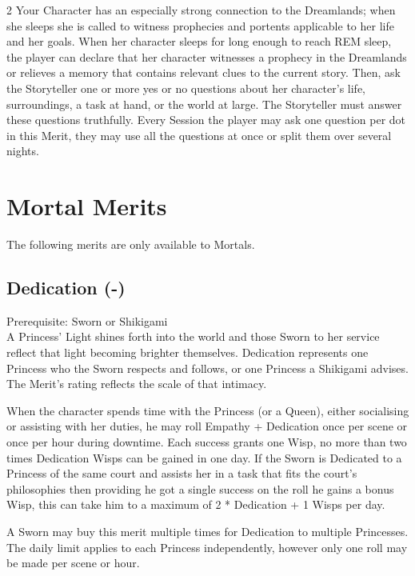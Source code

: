 \begin{multicols}{2}
\noindent Your Character has an especially strong connection to the Dreamlands; when she sleeps she is called to witness prophecies and portents applicable to her life and her goals. When her character sleeps for long enough to reach REM sleep, the player can declare that her character witnesses a prophecy in the Dreamlands or relieves a memory that contains relevant clues to the current story. Then, ask the Storyteller one or more yes or no questions about her character’s life, surroundings, a task at hand, or the world at large. The Storyteller must answer these questions truthfully. Every Session the player may ask one question per dot in this Merit, they may use all the questions at once or split them over several nights. 

\section*{Mortal Merits}

The following merits are only available to Mortals. 

\subsection*{Dedication (\textbullet\nobreak\hspace{.16667em}-\nobreak\hspace{.16667em}\textbullet\textbullet\textbullet\textbullet\textbullet)}

Prerequisite: Sworn or Shikigami \\

\noindent A Princess' Light shines forth into the world and those Sworn to her service reflect that light becoming brighter themselves. Dedication represents one Princess who the Sworn respects and follows, or one Princess a Shikigami advises. The Merit's rating reflects the scale of that intimacy. 

When the character spends time with the Princess (or a Queen), either socialising or assisting with her duties, he may roll Empathy + Dedication once per scene or once per hour during downtime. Each success grants one Wisp, no more than two times Dedication Wisps can be gained in one day. If the Sworn is Dedicated to a Princess of the same court and assists her in a task that fits the court's philosophies then providing he got a single success on the roll he gains a bonus Wisp, this can take him to a maximum of 2 * Dedication + 1 Wisps per day.

A Sworn may buy this merit multiple times for Dedication to multiple Princesses. The daily limit applies to each Princess independently, however only one roll may be made per scene or hour. 


\end{multicols}
